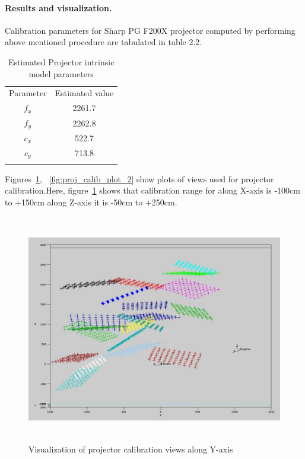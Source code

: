   
\paragraph{Results and visualization.}  
Calibration parameters for Sharp PG F200X projector computed by performing above mentioned procedure are tabulated in table 2.2.  
\begin{table}[htbp]  
\centering  
\begin{tabular}{c c}  
\hline\noalign{\smallskip}  
Parameter & Estimated value \\  
\noalign{\smallskip}\hline\noalign{\smallskip}  
$f_x$ & 2261.7\\  
$f_y$ & 2262.8\\  
$c_x$ & 522.7\\  
$c_y$ & 713.8\\  
\noalign{\smallskip}\hline  
\end{tabular}  
\caption{Estimated Projector intrinsic model parameters}  
\end{table}  
\noindent  
Figures~\ref{fig:proj_calib_plot_1}, ~\ref{fig:proj_calib_plot_2} show plots of views used for projector calibration.Here, figure~\ref{fig:proj_calib_plot_1} shows that calibration range for along X-axis is -100cm to +150cm along Z-axis it is -50cm to +250cm.  
\begin{figure}[htbp]  
\includegraphics[width=15cm,height=10cm]{../img_source/proj_calib_plot_1.jpg}   
\caption{Visualization of projector calibration views along Y-axis} 
\label{fig:proj_calib_plot_1} 
\end{figure}  
